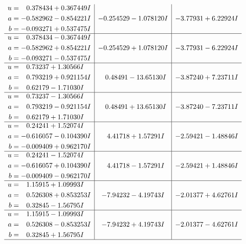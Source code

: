 \documentclass[1p]{elsarticle_modified}
\theoremstyle{definition}
\begin{document}
$$\begin{array}{c|c|c}
\begin{aligned}
u &= \phantom{-}0.378434 + 0.367449 I \\
a &= -0.582962 - 0.854221 I \\
b &= -0.093271 + 0.537475 I\end{aligned}
 & -0.254529 - 1.078120 I & -3.77931 + 6.22924 I \\ \hline\begin{aligned}
u &= \phantom{-}0.378434 - 0.367449 I \\
a &= -0.582962 + 0.854221 I \\
b &= -0.093271 - 0.537475 I\end{aligned}
 & -0.254529 + 1.078120 I & -3.77931 - 6.22924 I \\ \hline\begin{aligned}
u &= \phantom{-}0.73237 + 1.30566 I \\
a &= \phantom{-}0.793219 + 0.921154 I \\
b &= \phantom{-}0.62179 - 1.71030 I\end{aligned}
 & \phantom{-}0.48491 - 13.65130 I & -3.87240 + 7.23711 I \\ \hline\begin{aligned}
u &= \phantom{-}0.73237 - 1.30566 I \\
a &= \phantom{-}0.793219 - 0.921154 I \\
b &= \phantom{-}0.62179 + 1.71030 I\end{aligned}
 & \phantom{-}0.48491 + 13.65130 I & -3.87240 - 7.23711 I \\ \hline\begin{aligned}
u &= \phantom{-}0.24241 + 1.52074 I \\
a &= -0.616057 - 0.104390 I \\
b &= -0.009409 + 0.962170 I\end{aligned}
 & \phantom{-}4.41718 + 1.57291 I & -2.59421 - 1.48846 I \\ \hline\begin{aligned}
u &= \phantom{-}0.24241 - 1.52074 I \\
a &= -0.616057 + 0.104390 I \\
b &= -0.009409 - 0.962170 I\end{aligned}
 & \phantom{-}4.41718 - 1.57291 I & -2.59421 + 1.48846 I \\ \hline\begin{aligned}
u &= \phantom{-}1.15915 + 1.09993 I \\
a &= \phantom{-}0.526308 + 0.853253 I \\
b &= \phantom{-}0.32845 - 1.56795 I\end{aligned}
 & -7.94232 - 4.19743 I & -2.01377 + 4.62761 I \\ \hline\begin{aligned}
u &= \phantom{-}1.15915 - 1.09993 I \\
a &= \phantom{-}0.526308 - 0.853253 I \\
b &= \phantom{-}0.32845 + 1.56795 I\end{aligned}
 & -7.94232 + 4.19743 I & -2.01377 - 4.62761 I\\
 \hline 
 \end{array}$$\newpage\newpage\renewcommand{\arraystretch}{1}
\end{document}
